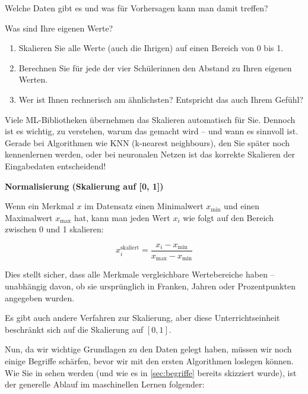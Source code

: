\begin{lpu}{Welche Daten gibt es und was für Vorhersagen kann man damit treffen?}
\begin{aufgabe}{5}
Was sind Ihre eigenen Werte? 

\begin{enumerate}
  \item Skalieren Sie alle Werte (auch die Ihrigen) auf einen Bereich von 0 bis 1.
  \item Berechnen Sie für jede der vier Schülerinnen den Abstand zu Ihren eigenen Werten.
  \item Wer ist Ihnen rechnerisch am ähnlichsten? Entspricht das auch Ihrem Gefühl?
\end{enumerate}

\end{aufgabe}

Viele ML-Bibliotheken übernehmen das Skalieren automatisch für Sie. Dennoch ist es wichtig, zu verstehen, warum das gemacht wird – und wann es sinnvoll ist. Gerade bei Algorithmen wie KNN (k-nearest neighbours), den Sie später noch kennenlernen werden, oder bei neuronalen Netzen ist das korrekte Skalieren der Eingabedaten entscheidend!

\begin{theorie}
\textbf{Normalisierung (Skalierung auf [0, 1])}

Wenn ein Merkmal \( x \) im Datensatz einen Minimalwert \( x_{\text{min}} \) und einen Maximalwert \( x_{\text{max}} \) hat, kann man jeden Wert \( x_i \) wie folgt auf den Bereich zwischen 0 und 1 skalieren:

\[
x_i^{\text{skaliert}} = \frac{x_i - x_{\text{min}}}{x_{\text{max}} - x_{\text{min}}}
\]

Dies stellt sicher, dass alle Merkmale vergleichbare Wertebereiche haben – unabhängig davon, ob sie ursprünglich in Franken, Jahren oder Prozentpunkten angegeben wurden.
\end{theorie}

Es gibt auch andere Verfahren zur Skalierung, aber diese Unterrichtseinheit beschränkt sich auf die Skalierung auf $[0,1]$.

Nun, da wir wichtige Grundlagen zu den Daten gelegt haben, müssen wir noch einige Begriffe schärfen, bevor wir mit den ersten Algorithmen loslegen können. Wie Sie in sehen werden (und wie es in \ref{sec:begriffe} bereits skizziert wurde), ist der generelle Ablauf im maschinellen Lernen folgender:

\begin{figure}
\begin{center}
\begin{tikzpicture}[
  node distance=1.8cm and 1.2cm,
  every node/.style={font=\sffamily},
  process/.style={draw, thick, rectangle, rounded corners, minimum width=2.8cm, minimum height=1cm, align=center, fill=blue!5},
  data/.style={draw, thick, rectangle, minimum width=2.8cm, minimum height=1cm, align=center, fill=gray!10},
  arrow/.style={->, thick}
]


\end{tikzpicture}
\end{center}
\end{figure}
\end{lpu}
